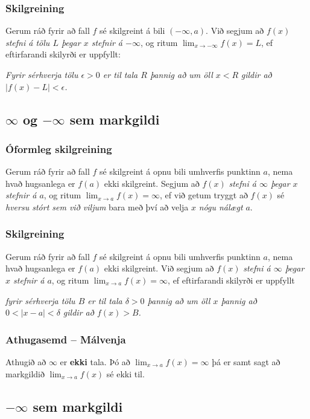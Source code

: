\documentclass[icelandic,a4paper,12pt]{article}
\begin{document}
\pause
 
\subsubsection{Skilgreining}
Gerum ráð fyrir að fall $f$ sé
skilgreint á bili $(-\infty,a)$.  Við segjum að $f(x)$
{\it stefni á tölu $L$ þegar $x$ stefnir á $-\infty$}, og ritum
$\lim_{x\rightarrow -\infty} f(x)=L$, ef eftirfarandi skilyrði er uppfyllt:

{\it Fyrir sérhverja tölu $\epsilon>0$ er til tala $R$ þannig að um öll $x<R$ } 
\emph{gildir að  $|f(x)-L|<\epsilon$.} 

\subsection{$\infty$ og $-\infty$ sem markgildi}
\subsubsection{Óformleg skilgreining}
Gerum ráð fyrir að fall $f$ sé
skilgreint á opnu bili umhverfis punktinn $a$, nema hvað hugsanlega er
$f(a)$ ekki skilgreint.  Segjum að  $f(x)$
{\it stefni á $\infty$ þegar $x$ stefnir á $a$}, og ritum
$\lim_{x\rightarrow a} f(x)=\infty$, ef við getum tryggt að  $f(x)$ sé {\em
hversu stórt sem við viljum}  bara með því að velja $x$ \emph{nógu nálægt} $a$.  
 
\pause
\subsubsection{Skilgreining}
Gerum ráð fyrir að fall $f$ sé
skilgreint á opnu bili umhverfis punktinn $a$, nema hvað hugsanlega er
$f(a)$ ekki skilgreint.  Við segjum að $f(x)$
{\it stefni á $\infty$ þegar $x$ stefnir á $a$}, og ritum
$\lim_{x\rightarrow a} f(x)=\infty$, ef eftirfarandi skilyrði er uppfyllt

{\it fyrir sérhverja tölu $B$ er til tala $\delta>0$ þannig
  að um öll $x$ þannig að} 
\emph{$0<|x-a|<\delta$ 
gildir að  $f(x)>B$.}


\subsubsection{Athugasemd -- Málvenja}  Athugið að $\infty$ er {\bf ekki} tala.  Þó 
að  $\lim_{x\rightarrow a} f(x)=\infty$ þá er samt sagt að
markgildið $\lim_{x\rightarrow a} f(x)$ sé ekki til.

\subsection{$-\infty$ sem markgildi}
\end{document}
